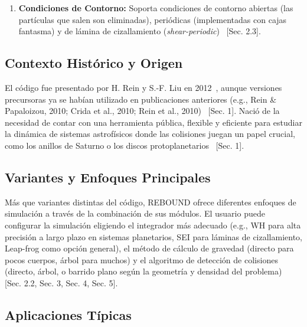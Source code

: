 \begin{enumerate}
    \item \textbf{Condiciones de Contorno:} Soporta condiciones de contorno abiertas (las partículas que salen son eliminadas), periódicas (implementadas con cajas fantasma) y de lámina de cizallamiento (\textit{shear-periodic})~\cite{Rein2012} [Sec. 2.3].
\end{enumerate}

\subsection{Contexto Histórico y Origen}

El código fue presentado por H. Rein y S.-F. Liu en 2012~\cite{Rein2012}, aunque versiones precursoras ya se habían utilizado en publicaciones anteriores (e.g., Rein \& Papaloizou, 2010; Crida et al., 2010; Rein et al., 2010)~\cite{Rein2012} [Sec. 1]. Nació de la necesidad de contar con una herramienta pública, flexible y eficiente para estudiar la dinámica de sistemas astrofísicos donde las colisiones juegan un papel crucial, como los anillos de Saturno o los discos protoplanetarios~\cite{Rein2012} [Sec. 1].

\subsection{Variantes y Enfoques Principales}

Más que variantes distintas del código, REBOUND ofrece diferentes enfoques de simulación a través de la combinación de sus módulos. El usuario puede configurar la simulación eligiendo el integrador más adecuado (e.g., WH para alta precisión a largo plazo en sistemas planetarios, SEI para láminas de cizallamiento, Leap-frog como opción general), el método de cálculo de gravedad (directo para pocos cuerpos, árbol para muchos) y el algoritmo de detección de colisiones (directo, árbol, o barrido plano según la geometría y densidad del problema)~\cite{Rein2012} [Sec. 2.2, Sec. 3, Sec. 4, Sec. 5].

\subsection{Aplicaciones Típicas}

